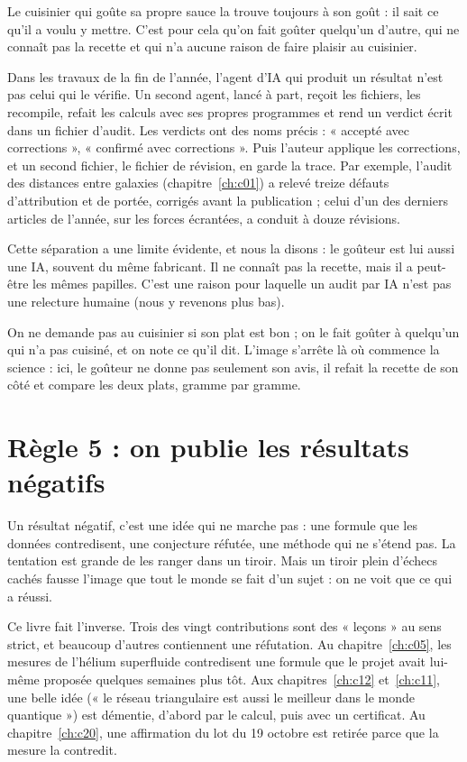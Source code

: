 Le cuisinier qui goûte sa propre sauce la trouve toujours à son goût : il sait ce qu'il a voulu y mettre. C'est pour
cela qu'on fait goûter quelqu'un d'autre, qui ne connaît pas la recette et qui n'a aucune raison de faire plaisir au
cuisinier.

Dans les travaux de la fin de l'année, l'agent d'IA qui produit un résultat n'est pas celui qui le vérifie. Un second agent, lancé à part,
reçoit les fichiers, les recompile, refait les calculs avec ses propres programmes et rend un verdict écrit dans un
fichier d'audit. Les verdicts ont des noms précis : « accepté avec corrections », « confirmé avec corrections ». Puis
l'auteur applique les corrections, et un second fichier, le fichier de révision, en garde la trace. Par exemple,
l'audit des distances entre galaxies (chapitre~\ref{ch:c01}) a relevé treize défauts d'attribution et de portée,
corrigés avant la publication ; celui d'un des derniers articles de l'année, sur les forces écrantées, a conduit à douze
révisions.

Cette séparation a une limite évidente, et nous la disons : le goûteur est lui aussi une IA, souvent du même fabricant.
Il ne connaît pas la recette, mais il a peut-être les mêmes papilles. C'est une raison pour laquelle un audit par IA
n'est pas une relecture humaine (nous y revenons plus bas).

\begin{analogie}
On ne demande pas au cuisinier si son plat est bon ; on le fait goûter à quelqu'un qui n'a pas cuisiné, et on note ce
qu'il dit. L'image s'arrête là où commence la science : ici, le goûteur ne donne pas seulement son avis, il refait la
recette de son côté et compare les deux plats, gramme par gramme.
\end{analogie}

\section{Règle 5 : on publie les résultats négatifs}

Un résultat négatif, c'est une idée qui ne marche pas : une formule que les données contredisent, une conjecture
réfutée, une méthode qui ne s'étend pas. La tentation est grande de les ranger dans un tiroir. Mais un tiroir plein
d'échecs cachés fausse l'image que tout le monde se fait d'un sujet : on ne voit que ce qui a réussi.

Ce livre fait l'inverse. Trois des vingt contributions sont des « leçons » au sens strict, et beaucoup d'autres
contiennent une réfutation. Au chapitre~\ref{ch:c05}, les mesures de l'hélium superfluide contredisent une formule que
le projet avait lui-même proposée quelques semaines plus tôt. Aux chapitres~\ref{ch:c12} et~\ref{ch:c11}, une belle
idée (« le réseau triangulaire est aussi le meilleur dans le monde quantique ») est démentie, d'abord par le calcul,
puis avec un certificat. Au
chapitre~\ref{ch:c20}, une affirmation du lot du 19 octobre est retirée parce que la mesure la contredit.

